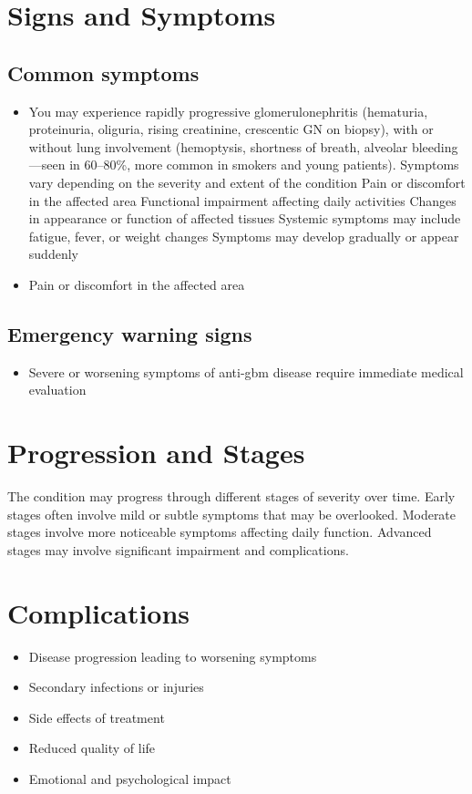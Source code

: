 \section{Signs and Symptoms}

\subsection{Common symptoms}
\begin{itemize}[noitemsep]
  \item You may experience rapidly progressive glomerulonephritis (hematuria, proteinuria, oliguria, rising creatinine, crescentic GN on biopsy), with or without lung involvement (hemoptysis, shortness of breath, alveolar bleeding---seen in 60--80\%, more common in smokers and young patients). Symptoms vary depending on the severity and extent of the condition Pain or discomfort in the affected area Functional impairment affecting daily activities Changes in appearance or function of affected tissues Systemic symptoms may include fatigue, fever, or weight changes Symptoms may develop gradually or appear suddenly
  \item Pain or discomfort in the affected area
  \end{itemize}

\subsection{Emergency warning signs}
\begin{itemize}[noitemsep]
  \item Severe or worsening symptoms of anti-gbm disease require immediate medical evaluation
\end{itemize}
\section{Progression and Stages}
The condition may progress through different stages of severity over time. Early stages often involve mild or subtle symptoms that may be overlooked. Moderate stages involve more noticeable symptoms affecting daily function. Advanced stages may involve significant impairment and complications.
\section{Complications}
\begin{itemize}[noitemsep]
  \item Disease progression leading to worsening symptoms
  \item Secondary infections or injuries
  \item Side effects of treatment
  \item Reduced quality of life
  \item Emotional and psychological impact
\end{itemize}

